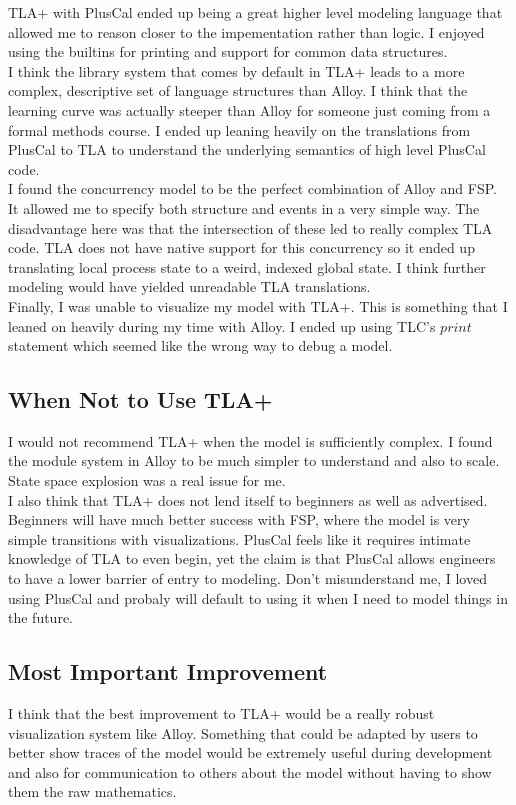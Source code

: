 \documentclass[11pt]{article}
\renewcommand{\_}{\rule{.4em}{.06em}\hspace{.05em}}
\renewcommand{\.}[1]{\ensuremath{\mbox{}#1\mbox{}}}
\begin{document}
\quad \quad TLA+ with PlusCal ended up being a great higher level modeling language that allowed me to reason closer to the impementation rather than logic. I enjoyed using the builtins for printing and support for common data structures. \\

I think the library system that comes by default in TLA+ leads to a more complex, descriptive set of language structures than Alloy. I think that the learning curve was actually steeper than Alloy for someone just coming from a formal methods course. I ended up leaning heavily on the translations from PlusCal to TLA to understand the underlying semantics of high level PlusCal code. \\

I found the concurrency model to be the perfect combination of Alloy and FSP. It allowed me to specify both structure and events in a very simple way. The disadvantage here was that the intersection of these led to really complex TLA code. TLA does not have native support for this concurrency so it ended up translating local process state to a weird, indexed global state. I think further modeling would have yielded unreadable TLA translations. \\

Finally, I was unable to visualize my model with TLA+. This is something that I leaned on heavily during my time with Alloy. I ended up using TLC's $print$ statement which seemed like the wrong way to debug a model.

\subsection{When Not to Use TLA+}

\quad \quad I would not recommend TLA+ when the model is sufficiently complex. I found the module system in Alloy to be much simpler to understand and also to scale. State space explosion was a real issue for me. \\

I also think that TLA+ does not lend itself to beginners as well as advertised. Beginners will have much better success with FSP, where the model is very simple transitions with visualizations. PlusCal feels like it requires intimate knowledge of TLA to even begin, yet the claim is that PlusCal allows engineers to have a lower barrier of entry to modeling. Don't misunderstand me, I loved using PlusCal and probaly will default to using it when I need to model things in the future.

\subsection{Most Important Improvement}

\quad \quad I think that the best improvement to TLA+ would be a really robust visualization system like Alloy. Something that could be adapted by users to better show traces of the model would be extremely useful during development and also for communication to others about the model without having to show them the raw mathematics.
\end{document}
